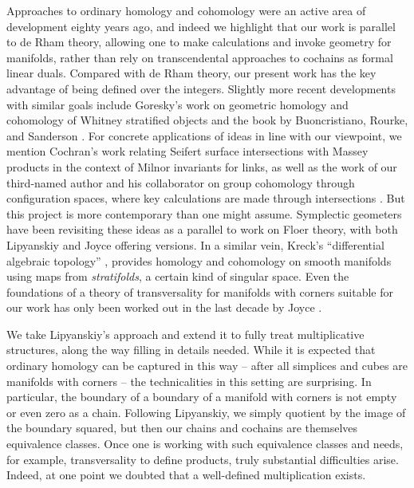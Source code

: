 Approaches to ordinary homology and cohomology were an active area of development eighty years ago, and indeed we highlight that our work is parallel to de Rham theory, allowing one to make calculations and invoke geometry for manifolds, rather than rely on transcendental approaches to cochains as formal linear duals.
Compared with de Rham theory, our present work has the key advantage of being defined over the integers.
Slightly more recent developments with similar goals include Goresky's work on geometric homology and cohomology of Whitney stratified objects \cite{goresky1981stratified} and the book by Buoncristiano, Rourke, and Sanderson \cite{buoncristiano1976homology}.
For concrete applications of ideas in line with our viewpoint, we mention Cochran's work \cite{cochran1990milnor} relating Seifert surface intersections with Massey products in the context of Milnor invariants for links, as well as the work of our third-named author and his collaborator on group cohomology through configuration spaces, where key calculations are made through intersections \cite{giusti2012symmetric, giusti2021alternating}.
But this project is more contemporary than one might assume.
Symplectic geometers have been revisiting these ideas as a parallel to work on Floer theory, with both Lipyanskiy \cite{Lipy14} and Joyce \cite{Joyc15} offering versions.
In a similar vein, Kreck's ``differential algebraic topology'' \cite{Krec10}, provides homology and cohomology on smooth manifolds using maps from \textit{stratifolds}, a certain kind of singular space.
Even the foundations of a theory of transversality for manifolds with corners suitable for our work
has only  been worked out in the last decade by Joyce \cite{Joy12}.

We take Lipyanskiy's approach and extend it to fully treat multiplicative structures, along the way filling in details needed.
While it is expected that ordinary homology can be captured in this way -- after all simplices and cubes are manifolds with corners -- the technicalities in this setting are surprising.
In particular, the boundary of a boundary of a manifold with corners is not empty or even zero as a chain.
Following Lipyanskiy, we simply quotient by the image of the boundary squared, but then our chains and cochains are themselves equivalence classes.
Once one is working with such equivalence classes and needs, for example, transversality to define products, truly substantial difficulties arise.
Indeed, at one point we doubted that a well-defined multiplication exists.

